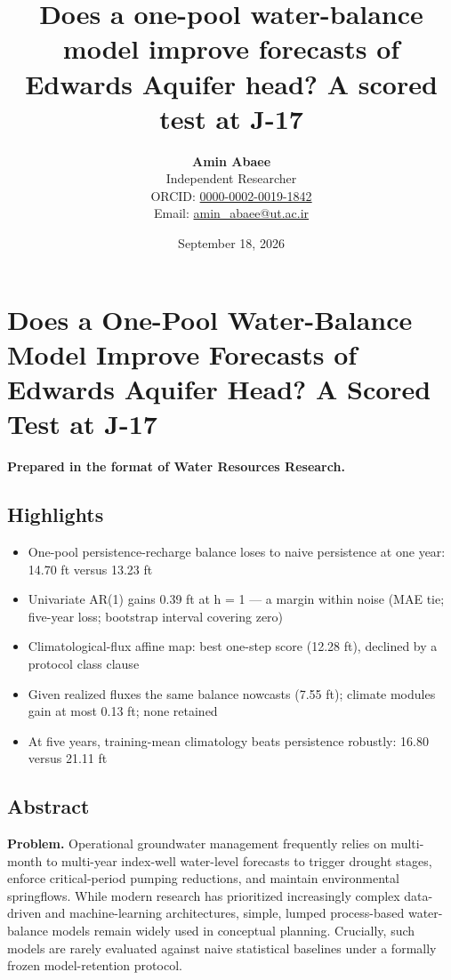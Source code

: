 \documentclass[11pt]{article}
\title{Does a one-pool water-balance model improve forecasts of Edwards Aquifer head? A scored test at J-17}
\author{\textbf{Amin Abaee}\\ Independent Researcher\\[2pt] ORCID: \href{https://orcid.org/0000-0002-0019-1842}{0000-0002-0019-1842}\\ Email: \href{mailto:amin_abaee@ut.ac.ir}{amin_abaee@ut.ac.ir}}
\date{September 18, 2026}
\providecommand{\tightlist}{\setlength{\itemsep}{0.2em}\setlength{\parskip}{0pt}}
\begin{document}
\maketitle

\section{Does a One-Pool Water-Balance Model Improve Forecasts of
Edwards Aquifer Head? A Scored Test at
J-17}\label{does-a-one-pool-water-balance-model-improve-forecasts-of-edwards-aquifer-head-a-scored-test-at-j-17}

\textbf{Prepared in the format of Water Resources Research.}

\subsection{Highlights}\label{highlights}

\begin{itemize}
\tightlist
\item
  One-pool persistence-recharge balance loses to naive persistence at
  one year: 14.70 ft versus 13.23 ft
\item
  Univariate AR(1) gains 0.39 ft at h = 1 --- a margin within noise (MAE
  tie; five-year loss; bootstrap interval covering zero)
\item
  Climatological-flux affine map: best one-step score (12.28 ft),
  declined by a protocol class clause
\item
  Given realized fluxes the same balance nowcasts (7.55 ft); climate
  modules gain at most 0.13 ft; none retained
\item
  At five years, training-mean climatology beats persistence robustly:
  16.80 versus 21.11 ft
\end{itemize}

\subsection{Abstract}\label{abstract}

\textbf{Problem.} Operational groundwater management frequently relies
on multi-month to multi-year index-well water-level forecasts to trigger
drought stages, enforce critical-period pumping reductions, and maintain
environmental springflows. While modern research has prioritized
increasingly complex data-driven and machine-learning architectures,
simple, lumped process-based water-balance models remain widely used in
conceptual planning. Crucially, such models are rarely evaluated against
naive statistical baselines under a formally frozen model-retention
protocol.
\end{document}
